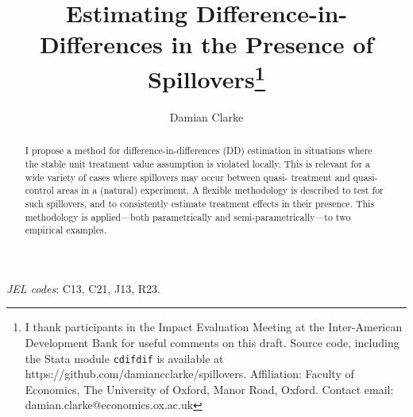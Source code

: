 \documentclass{article}
\title{Estimating Difference-in-Differences in the Presence of Spillovers\footnote{
I thank participants in the Impact Evaluation Meeting at the Inter-American 
Development Bank for useful comments on this draft. Source code, including the
Stata module \texttt{cdifdif} is available at 
https://github.com/damiancclarke/spillovers.  Affiliation: Faculty of Economics, 
The University of Oxford, Manor Road, Oxford. Contact email: 
damian.clarke@economics.ox.ac.uk}}
\author{Damian Clarke}
\begin{document}
\maketitle


\begin{abstract}
I propose a method for difference-in-differences (DD) estimation in situations 
where the stable unit treatment value assumption is violated locally. This is
relevant for a wide variety of cases where spillovers may occur between quasi-%
treatment and quasi-control areas in a (natural) experiment. A flexible 
methodology is described to test for such spillovers, and to consistently 
estimate treatment effects in their presence. This methodology is applied---both 
parametrically and semi-parametrically---to two empirical examples.
\end{abstract}
\hspace{8mm} \emph{JEL codes}: C13, C21, J13, R23. \\
\end{document}
